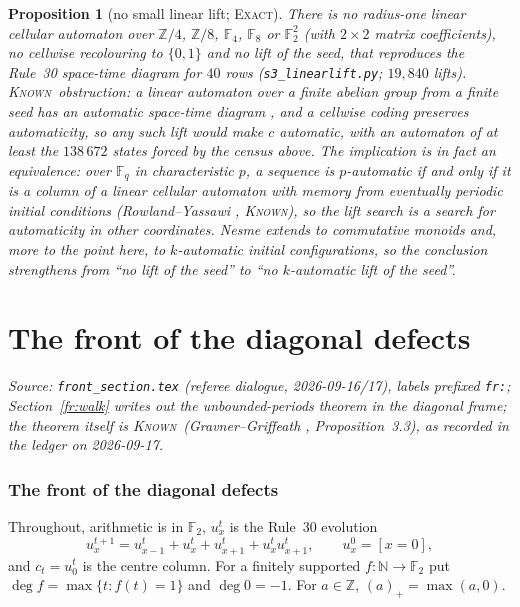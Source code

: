 \documentclass[11pt]{article}
\newtheorem{proposition}[theorem]{Proposition}
\theoremstyle{definition}
\theoremstyle{remark}
\newcommand{\N}{\mathbb{N}}
\newcommand{\Z}{\mathbb{Z}}
\newcommand{\F}{\mathbb{F}_2}
\newcommand{\EXACT}{\textsc{Exact}}
\newcommand{\KNOWN}{\textsc{Known}}
\begin{document}
\begin{proposition}[no small linear lift; \EXACT]\label{du:lift}
There is no radius-one linear cellular automaton over $\Z/4$, $\Z/8$, $\mathbb F_4$, $\mathbb F_8$ or $\F^2$ (with $2\times2$ matrix coefficients), no cellwise recolouring to $\{0,1\}$ and no lift of the seed, that reproduces the Rule~30 space-time diagram for $40$ rows (\texttt{s3\_linearlift.py}; $19{,}840$ lifts). \KNOWN\ obstruction: a linear automaton over a finite abelian group from a finite seed has an automatic space-time diagram \cite{AvHPS}, and a cellwise coding preserves automaticity, so any such lift would make $c$ automatic, with an automaton of at least the $138\,672$ states forced by the census above. The implication is in fact an equivalence: over $\mathbb F_q$ in characteristic $p$, a sequence is $p$-automatic if and only if it is a column of a linear cellular automaton with memory from eventually periodic initial conditions (Rowland--Yassawi \cite{RY}, \KNOWN), so the lift search is a search for automaticity in other coordinates. Nesme \cite{Nesme} extends \cite{AvHPS} to commutative monoids and, more to the point here, to $k$-automatic initial configurations, so the conclusion strengthens from ``no lift of the seed'' to ``no $k$-automatic lift of the seed''.
\end{proposition}

\part{The front of the diagonal defects}

\noindent\emph{Source: \texttt{front\_section.tex} (referee dialogue, 2026-09-16/17), labels prefixed \texttt{fr:}; Section~\ref{fr:walk} writes out the unbounded-periods theorem in the diagonal frame; the theorem itself is \KNOWN\ (Gravner--Griffeath \cite{GG}, Proposition~3.3), as recorded in the ledger on 2026-09-17.}

\section{The front of the diagonal defects}\label{fr:sec:front}

Throughout, arithmetic is in $\F$, $u^t_x$ is the Rule~30 evolution
\[
u^{t+1}_x=u^t_{x-1}+u^t_x+u^t_{x+1}+u^t_xu^t_{x+1},\qquad u^0_x=[x=0],
\]
and $c_t=u^t_0$ is the centre column. For a finitely supported
$f\colon\N\to\F$ put $\deg f=\max\{t:f(t)=1\}$ and $\deg 0=-1$.
For $a\in\mathbb{Z}$, $(a)_+=\max(a,0)$.
\end{document}
